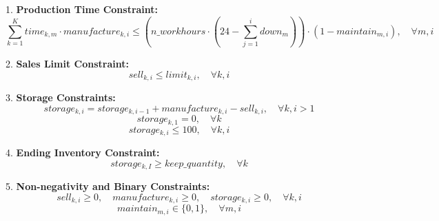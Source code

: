 \documentclass{article}
\begin{document}
1. \textbf{Production Time Constraint:}
\[
\sum_{k=1}^{K} time_{k, m} \cdot manufacture_{k, i} \leq (n\_workhours \cdot (24 - \sum_{j=1}^{i} down_{m})) \cdot (1 - maintain_{m, i}), \quad \forall m, i
\]

2. \textbf{Sales Limit Constraint:}
\[
sell_{k, i} \leq limit_{k, i}, \quad \forall k, i
\]

3. \textbf{Storage Constraints:}
\[
storage_{k, i} = storage_{k, i-1} + manufacture_{k, i} - sell_{k, i}, \quad \forall k, i > 1
\]
\[
storage_{k, 1} = 0, \quad \forall k
\]
\[
storage_{k, i} \leq 100, \quad \forall k, i
\]

4. \textbf{Ending Inventory Constraint:}
\[
storage_{k, I} \geq keep\_quantity, \quad \forall k
\]

5. \textbf{Non-negativity and Binary Constraints:}
\[
sell_{k, i} \geq 0, \quad manufacture_{k, i} \geq 0, \quad storage_{k, i} \geq 0, \quad \forall k, i
\]
\[
maintain_{m, i} \in \{0, 1\}, \quad \forall m, i
\]
\end{document}
